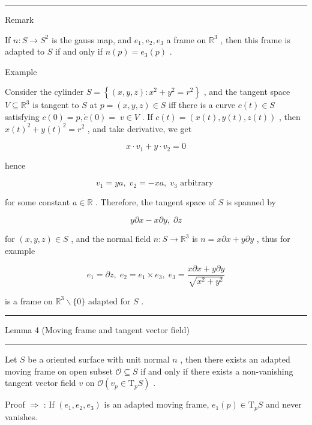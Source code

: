 \documentclass[lang=cn,a4paper,11pt,openany,twoside]{elegantbook}
\newcommand{\HRule}{\begin{center}\rule{0.9\linewidth}{0.2mm}\end{center}}
\begin{document}
\HRule

Remark

If \(n : S \rightarrow  {S}^{2}\) is the gauss map, and \({e}_{1},{e}_{2},{e}_{3}\) a frame on \({\mathbb{R}}^{3}\) , then this frame is adapted to \(S\) if and only if \(n\left( p\right)  = {e}_{3}\left( p\right)\) .

Example

Consider the cylinder \(S = \left\{  {\left( {x,y,z}\right)  : {x}^{2} + {y}^{2} = {r}^{2}}\right\}\) , and the tangent space \(V \subseteq  {\mathbb{R}}^{3}\) is tangent to \(S\) at \(p = \left( {x,y,z}\right)  \in  S\) iff there is a curve \(c\left( t\right)  \in  S\) satisfying \(c\left( 0\right)  = p,\dot{c}\left( 0\right)  = \; v \in  V\) . If \(c\left( t\right)  = \left( {x\left( t\right) ,y\left( t\right) ,z\left( t\right) }\right)\) , then \(x{\left( t\right) }^{2} + y{\left( t\right) }^{2} = {r}^{2}\) , and take derivative, we get

\[
x \cdot  {v}_{1} + y \cdot  {v}_{2} = 0
\]

hence

\[
{v}_{1} = {ya},\;{v}_{2} =  - {xa},\;{v}_{3}\text{ arbitrary }
\]

for some constant \(a \in  \mathbb{R}\) . Therefore, the tangent space of \(S\) is spanned by

\[
y\partial x - x\partial y,\;\partial z
\]

for \(\left( {x,y,z}\right)  \in  S\) , and the normal field \(n : S \rightarrow  {\mathbb{R}}^{3}\) is \(n = x\partial x + y\partial y\) , thus for example

\[
{e}_{1} = \partial z,\;{e}_{2} = {e}_{1} \times  {e}_{3},\;{e}_{3} = \frac{x\partial x + y\partial y}{\sqrt{{x}^{2} + {y}^{2}}}
\]

is a frame on \({\mathbb{R}}^{3} \smallsetminus  \{ 0\}\) adapted for \(S\) .

\HRule

Lemma 4 (Moving frame and tangent vector field)

\HRule

Let \(S\) be a oriented surface with unit normal \(n\) , then there exists an adapted moving frame on open subset \(\mathcal{O} \subseteq  S\) if and only if there exists a non-vanishing tangent vector field \(v\) on \(\mathcal{O}\left( {{v}_{p} \in  {\mathrm{T}}_{p}S}\right)\) .

Proof \(\Rightarrow\) : If \(\left( {{e}_{1},{e}_{2},{e}_{3}}\right)\) is an adapted moving frame, \({e}_{1}\left( p\right)  \in  {\mathrm{T}}_{p}S\) and never vanishes.
\end{document}
